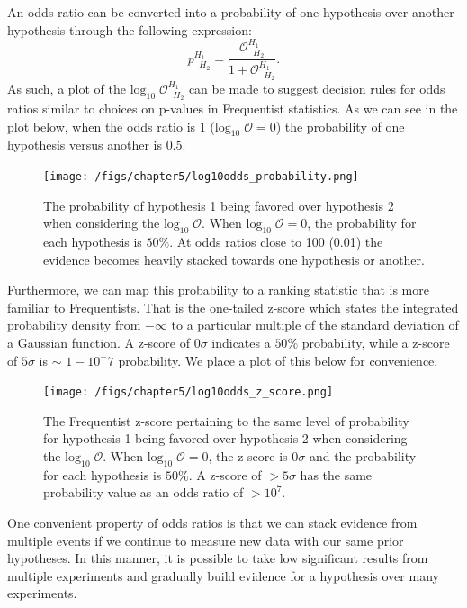 An odds ratio can be converted into a probability of one hypothesis over another hypothesis through the following expression:
\begin{equation}\label{eqn:probability_odds_ratio}
    p^{H_1 \;\;}_{\;\;H_2} = \frac{\mathcal{O}^{H_1\;\;}_{\;\;H_2}}{1 + \mathcal{O}^{H_1\;\;}_{\;\;H_2}}.
\end{equation}
As such, a plot of the $\mathrm{log}_{10} \; \mathcal{O}^{H_1\;\;}_{\;\;H_2}$ can be made to suggest decision rules for odds ratios similar to choices on p-values in Frequentist statistics. As we can see in the plot below, when the odds ratio is 1 ($\mathrm{log}_{10} \; \mathcal{O} = 0$) the probability of one hypothesis versus another is $0.5$. 
\begin{figure}
  \texttt{[image: /figs/chapter5/log10odds\_probability.png]}
  \caption{The probability of hypothesis 1 being favored over hypothesis 2 when considering the $\mathrm{log}_{10} \; \mathcal{O}$. When $\mathrm{log}_{10} \; \mathcal{O} = 0$, the probability for each hypothesis is $50\%$. At odds ratios close to 100 (0.01) the evidence becomes heavily stacked towards one hypothesis or another.}
  \label{fig:log10odds_v_probability}
\end{figure}
Furthermore, we can map this probability to a ranking statistic that is more familiar to Frequentists. That is the one-tailed z-score which states the integrated probability density from $-\infty$ to a particular multiple of the standard deviation of a Gaussian function. A z-score of $0 \sigma$ indicates a $50\%$ probability, while a z-score of $5 \sigma$ is $\sim$ $1-10^-7$ probability. We place a plot of this below for convenience.
\begin{figure}
  \texttt{[image: /figs/chapter5/log10odds\_z\_score.png]}
  \caption{The Frequentist z-score pertaining to the same level of probability for  hypothesis 1 being favored over hypothesis 2 when considering the $\mathrm{log}_{10} \; \mathcal{O}$. When $\mathrm{log}_{10} \; \mathcal{O} = 0$, the z-score is $0 \sigma$ and the probability for each hypothesis is $50\%$. A z-score of $>5 \sigma$ has the same probability value as an odds ratio of $> 10^7$.}
  \label{fig:log10odds_v_z_score}
\end{figure}

One convenient property of odds ratios is that we can stack evidence from multiple events if we continue to measure new data with our same prior hypotheses. In this manner, it is possible to take low significant results from multiple experiments and gradually build evidence for a hypothesis over many experiments.

